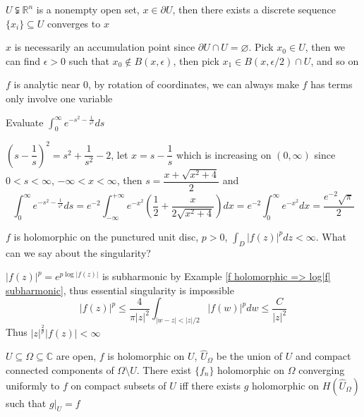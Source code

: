 \documentclass[main]{subfiles}
\begin{document}
\begin{exercise}\label{U<R^n open, boundary point is the limit of some discrete sequence}
$U\subsetneqq\mathbb R^n$ is a nonempty open set, $x\in\partial U$, then there exists a discrete sequence $\{x_i\}\subseteq U$ converges to $x$
\end{exercise}

\begin{solution}
$x$ is necessarily an accumulation point since $\partial U\cap U=\varnothing$. Pick $x_0\in U$, then we can find $\epsilon>0$ such that $x_0\notin B(x,\epsilon)$, then pick $x_1\in B(x,\epsilon/2)\cap U$, and so on
\end{solution}

\begin{exercise}\label{f analytic near 0, after change of variables, f has terms only involve one variable}
$f$ is analytic near $0$, by rotation of coordinates, we can always make $f$ has terms only involve one variable
\end{exercise}

\begin{exercise}
Evaluate $\displaystyle\int_0^\infty e^{-s^2-\frac{1}{s^2}}ds$
\end{exercise}

\begin{solution}
$\left(s-\dfrac{1}{s}\right)^2=s^2+\dfrac{1}{s^2}-2$, let $x=s-\dfrac{1}{s}$ which is increasing on $(0,\infty)$ since $0<s<\infty$, $-\infty<x<\infty$, then $s=\dfrac{x+\sqrt{x^2+4}}{2}$ and
\[\displaystyle\int_0^\infty e^{-s^2-\frac{1}{s^2}}ds=e^{-2}\int_{-\infty}^{+\infty}e^{-x^2}\left(\dfrac{1}{2}+\dfrac{x}{2\sqrt{x^2+4}}\right)dx=e^{-2}\int_0^\infty e^{-x^2}dx=\dfrac{e^{-2}\sqrt{\pi}}{2}\]
\end{solution}

\begin{exercise}
$f$ is holomorphic on the punctured unit disc, $p>0$, $\displaystyle \int_{D}|f(z)|^pdz<\infty$. What can we say about the singularity?
\end{exercise}

\begin{solution}
$|f(z)|^p=e^{p\log|f(z)|}$ is subharmonic by Example \ref{f holomorphic => log|f| subharmonic}, thus essential singularity is impossible
\[|f(z)|^p\leq\frac{4}{\pi |z|^2}\int_{|w-z|<|z|/2}|f(w)|^pdw\leq \frac{C}{|z|^2}\]
Thus $|z|^\frac{2}{p}|f(z)|<\infty$
\end{solution}

\begin{exercise}
$U\subseteq\Omega\subseteq\mathbb C$ are open, $f$ is holomorphic on $U$, $\widehat U_\Omega$ be the union of $U$ and compact connected components of $\Omega\setminus U$. There exist $\{f_n\}$ holomorphic on $\Omega$ converging uniformly to $f$ on compact subsets of $U$ iff there exists $g$ holomorphic on $H(\widehat U_\Omega)$ such that $g|_U=f$
\end{exercise}
\end{document}
